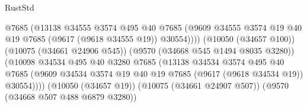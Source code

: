\begin{lexlean}{RustStd}
\begin{coremodule}
                                                  @7685
                                                  (@13138
                                                    @34555
                                                    @3574
                                                    @495
                                                    @40
                                                    @7685
                                                    (@9609
                                                      @34555
                                                      @3574
                                                      @19
                                                      @40
                                                      @19
                                                      @7685
                                                      (@9617 (@9618 @34555 @19))
                                                      @30554))))
                                              (@10050 (@34657 @100))
                                              (@10075 (@34661 @24906 @545))
                                              (@9570 (@34668 @545 @1494 @8035 @3280))
                                              (@10098
                                                @34534
                                                @495
                                                @40
                                                @3280
                                                @7685
                                                (@13138
                                                  @34534
                                                  @3574
                                                  @495
                                                  @40
                                                  @7685
                                                  (@9609
                                                    @34534
                                                    @3574
                                                    @19
                                                    @40
                                                    @19
                                                    @7685
                                                    (@9617 (@9618 @34534 @19))
                                                    @30554))))
                                            (@10050 (@34657 @19))
                                            (@10075 (@34661 @24907 @507))
                                            (@9570 (@34668 @507 @488 @6879 @3280))

\end{coremodule}
\end{lexlean}

